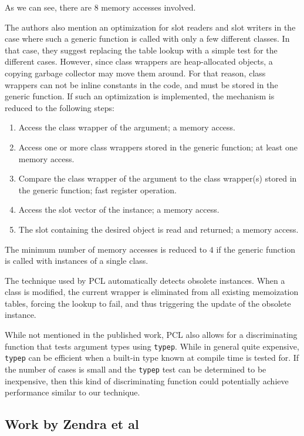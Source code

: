 As we can see, there are $8$ memory accesses involved. 

The authors also mention an optimization for slot readers and slot
writers in the case where such a generic function is called with only
a few different classes.  In that case, they suggest replacing the
table lookup with a simple test for the different cases.  However,
since class wrappers are heap-allocated objects, a copying garbage
collector may move them around.  For that reason, class wrappers can
not be inline constants in the code, and must be stored in the generic
function.  If such an optimization is implemented, the mechanism is
reduced to the following steps:

\begin{enumerate}
\item Access the class wrapper of the argument; a memory access.
\item Access one or more class wrappers stored in the generic
  function; at least one memory access.
\item Compare the class wrapper of the argument to the class
  wrapper(s) stored in the generic function; fast register operation.
\item Access the slot vector of the instance; a memory access.
\item The slot containing the desired object is read and returned; a
  memory access.
\end{enumerate}

The minimum number of memory accesses is reduced to $4$ if the generic
function is called with instances of a single class.  

The technique used by PCL automatically detects obsolete instances.
When a class is modified, the current wrapper is eliminated from all
existing memoization tables, forcing the lookup to fail, and thus
triggering the update of the obsolete instance.  

While not mentioned in the published work, PCL also allows for a
discriminating function that tests argument types using
\texttt{typep}.  While in general quite expensive, \texttt{typep} can
be efficient when a built-in type known at compile time is tested for.
If the number of cases is small and the \texttt{typep} test can be
determined to be inexpensive, then this kind of discriminating
function could potentially achieve performance similar to our
technique. 

\subsection{Work by Zendra et al}


